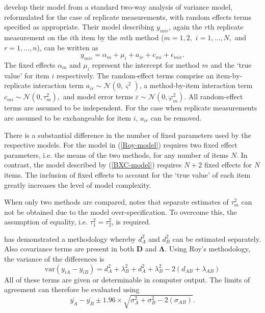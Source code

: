 \documentclass[12pt, a4paper]{report}
\theoremstyle{plain}
\theoremstyle{definition}
\theoremstyle{remark}
\begin{document}
	\citet{BXC2008} develop their model from a standard two-way analysis of variance model, reformulated for the case of replicate measurements, with random effects terms specified as appropriate. 
	Their model describing $y_{mir} $, again the $r$th replicate measurement on the $i$th item by the $m$th method ($m=1,2,$ $i=1,\ldots,N,$ and $r = 1,\ldots,n$), can be written as
	\begin{equation}\label{BXC-model}
	y_{mir}  = \alpha_{m} + \mu_{i} + a_{ir} + c_{mi} + \epsilon_{mir}.
	\end{equation}
	The fixed effects $\alpha_{m}$ and $\mu_{i}$  represent the intercept for method $m$ and the `true value' for item $i$ respectively. The random-effect terms comprise an item-by-replicate interaction term $a_{ir} \sim \mathcal{N}(0,\varsigma^{2})$, a method-by-item interaction term $c_{mi} \sim \mathcal{N}(0,\tau^{2}_{m}),$ and model error terms $\varepsilon \sim \mathcal{N}(0,\varphi^{2}_{m}).$ All random-effect terms are assumed to be independent.
	For the case when replicate measurements are assumed to be exchangeable for item $i$, $a_{ir}$ can be removed.
	
	There is a substantial difference in the number of fixed parameters used by the respective models. For the model in (\ref{Roy-model}) requires two fixed effect parameters, i.e. the means of the two methods, for any number of items $N$. In contrast, the model described by (\ref{BXC-model}) requires $N+2$ fixed effects for $N$ items. The inclusion of fixed effects to account for the `true value' of each item greatly increases the level of model complexity.
	
	When only two methods are compared, \citet{BXC2008} notes that separate estimates of $\tau^2_m$ can not be obtained due to the model over-specification. To overcome this, the assumption of equality, i.e. $\tau^2_1 = \tau^2_2$, is required.
	\newpage
	
	\newpage
	
	
	\citet{ARoy2009} has demonstrated a methodology whereby $d^2_{A}$ and $d^2_{B}$ can be estimated separately. Also covariance terms are present in both $\boldsymbol{D}$ and $\boldsymbol{\Lambda}$. Using Roy's methodology, the variance of the differences is
	\begin{equation}
	\mbox{var} (y_{iA}-y_{iB})= d^2_{A} + \lambda^2_{B} + d^2_{A} + \lambda^2_{B} - 2(d_{AB} + \lambda_{AB})
	\end{equation}
	All of these terms are given or determinable in computer output.
	The limits of agreement can therefore be evaluated using
	\begin{equation}
	\bar{y_{A}}-\bar{y_{B}} \pm 1.96 \times \sqrt{ \sigma^2_{A} + \sigma^2_{B}  - 2(\sigma_{AB})}.
	\end{equation}
	\newpage
\end{document}
